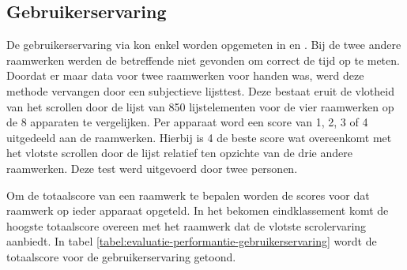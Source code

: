 \subsection{Gebruikerservaring}
\label{sec:evaluatie-gebruikerservaring}
De gebruikerservaring via \js{} kon enkel worden opgemeten in \jqm{} en \kendo{}.
Bij de twee andere raamwerken werden de betreffende  niet gevonden om correct de tijd op te meten.
Doordat er maar data voor twee raamwerken voor handen was, werd deze methode vervangen door een subjectieve lijsttest.
Deze bestaat eruit de vlotheid van het scrollen door de lijst van 850 lijstelementen voor de vier raamwerken op de 8 apparaten te vergelijken.
Per apparaat word een score van 1, 2, 3 of 4 uitgedeeld aan de raamwerken.
Hierbij is 4 de beste score wat overeenkomt met het vlotste scrollen door de lijst relatief ten opzichte van de drie andere raamwerken.
Deze test werd uitgevoerd door twee personen.

Om de totaalscore van een raamwerk te bepalen worden de scores voor dat raamwerk op ieder apparaat opgeteld.
In het bekomen eindklassement komt de hoogste totaalscore overeen met het raamwerk dat de vlotste scrolervaring aanbiedt. In tabel \ref{tabel:evaluatie-performantie-gebruikerservaring} wordt de totaalscore voor de gebruikerservaring getoond.

\begin{table}[H]
\centering
{}
\caption{Gebruikerservaring voor \st{}~(\sta), \kendo{}~(\kendoa), \jqm{}~(\jqma) en \lungo{}~(\lungoa).}
\label{tabel:evaluatie-performantie-gebruikerservaring}
\end{table}

